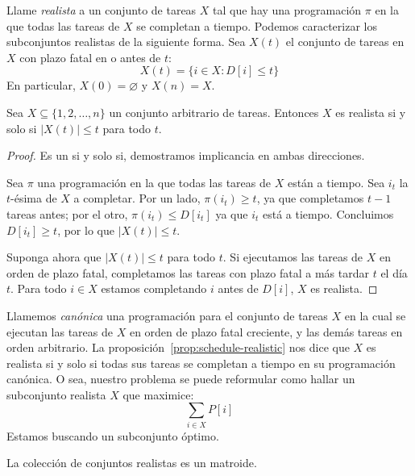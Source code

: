   Llame \emph{realista} a un conjunto de tareas \(X\)
  tal que hay una programación \(\pi\) en la que todas las tareas de \(X\)
  se completan a tiempo.
  Podemos caracterizar los subconjuntos realistas de la siguiente forma.
  Sea \(X(t)\) el conjunto de tareas en \(X\)
  con plazo fatal en o antes de \(t\):
  \begin{equation*}
    X(t)
      = \{ i \in X \colon D[i] \le t \}
  \end{equation*}
  En particular,
  \(X(0) = \varnothing\) y \(X(n) = X\).
  \begin{proposition}
    \label{prop:schedule-realistic}
    Sea \(X \subseteq \{ 1, 2, \dotsc, n \}\) un conjunto arbitrario de tareas.
    Entonces \(X\) es realista si y solo si \(\lvert X(t) \rvert \le t\)
    para todo \(t\).
  \end{proposition}
  \begin{proof}
    Es un si y solo si,
    demostramos implicancia en ambas direcciones.

    Sea \(\pi\) una programación
    en la que todas las tareas de \(X\) están a tiempo.
    Sea \(i_t\) la \(t\)\nobreakdash-ésima de \(X\) a completar.
    Por un lado,
    \(\pi(i_t) \ge t\),
    ya que completamos \(t - 1\) tareas antes;
    por el otro,
    \(\pi(i_t) \le D[i_t]\) ya que \(i_t\) está a tiempo.
    Concluimos \(D[i_t] \ge t\),
    por lo que \(\lvert X(t) \rvert \le t\).

    Suponga ahora que \(\lvert X(t) \rvert \le t\) para todo \(t\).
    Si ejecutamos las tareas de \(X\) en orden de plazo fatal,
    completamos las tareas con plazo fatal a más tardar \(t\)
    el día \(t\).
    Para todo \(i \in X\) estamos completando \(i\) antes de \(D[i]\),
    \(X\) es realista.
  \end{proof}
  Llamemos \emph{canónica} una programación para el conjunto de tareas \(X\)
  en la cual se ejecutan las tareas de \(X\) en orden de plazo fatal creciente,
  y las demás tareas en orden arbitrario.
  La proposición~\ref{prop:schedule-realistic}
  nos dice que \(X\) es realista
  si y solo si todas sus tareas se completan a tiempo
  en su programación canónica.
  O sea,
  nuestro problema se puede reformular como
  hallar un subconjunto realista \(X\) que maximice:
  \begin{equation*}
    \sum_{i \in X} P[i]
  \end{equation*}
  Estamos buscando un subconjunto óptimo.
  \begin{proposition}
    \label{prop:realistic=matroid}
    La colección de conjuntos realistas es un matroide.
  \end{proposition}
